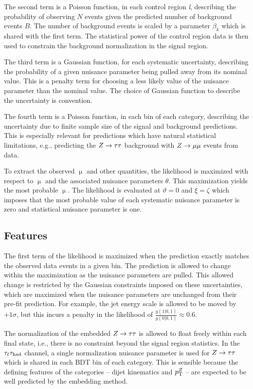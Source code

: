 The second term is a Poisson function, in each control region \textit{l}, describing the probability of observing $N$ events given the predicted number of background events $B$. The number of background events is scaled by a parameter $\beta_k$ which is shared with the first term. The statistical power of the control region data is then used to constrain the background normalization in the signal region.

The third term is a Gaussian function, for each systematic uncertainty, describing the probability of a given nuisance parameter being pulled away from its nominal value. This is a penalty term for choosing a less likely value of the nuisance parameter than the nominal value. The choice of Gaussian function to describe the uncertainty is convention.

The fourth term is a Poisson function, in each bin of each category, describing the uncertainty due to finite sample size of the signal and background predictions. This is especially relevant for predictions which have natural statistical limitations, e.g., predicting the $Z\rightarrow\tau\tau$ background with $Z \rightarrow \mu\mu$ events from data.

To extract the observed $\upmu$ and other quantities, the likelihood is maximized with respect to $\upmu$ and the associated nuisance parameters $\theta$. This maximization yields the most probable $\upmu$. The likelihood is evaluated at $\vartheta = 0$ and $\xi = \zeta$ which imposes that the most probable value of each systematic nuisance parameter is zero and statistical nuisance parameter is one.

\subsection{Features}

The first term of the likelihood is maximized when the prediction exactly matches the observed data events in a given bin. The prediction is allowed to change within the maximization as the nuisance parameters are pulled. This allowed change is restricted by the Gaussian constraints imposed on these uncertainties, which are maximized when the nuisance parameters are unchanged from their pre-fit prediction. For example, the jet energy scale is allowed to be moved by $+1\sigma$, but this incurs a penalty in the likelihood of $\frac{g(1|0,1)}{g(0|0,1)}\approx 0.6$. 

The normalization of the embedded $Z\rightarrow\tau\tau$ is allowed to float freely within each final state, i.e., there is no constraint beyond the signal region statistics. In the $\tau_\ell\tau_\text{had}$ channel, a single normalization nuisance parameter is used for $Z\rightarrow\tau\tau$ which is shared in each BDT bin of each category. This is sensible because the defining features of the categories -- dijet kinematics and $p_{\mathrm{T}}^Z$ -- are expected to be well predicted by the embedding method.

